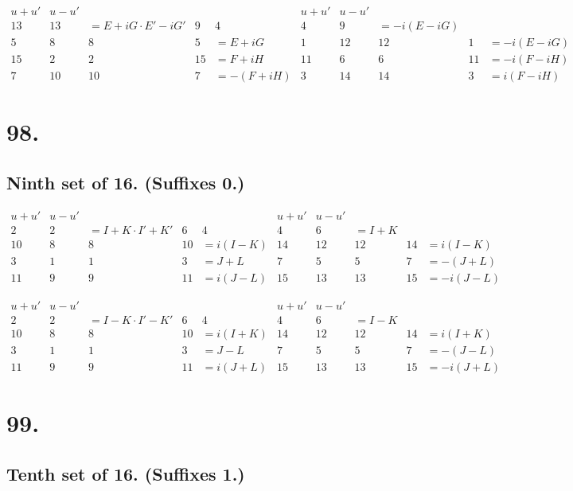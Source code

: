 \documentclass[11pt,a4paper]{book}
\begin{document}
\[
\begin{array}{c|cccc|c|cccc}
u+u' & u-u' & & & & u+u' & u-u' & & & \\
\hline
13 & 13 & = E+iG \cdot E'-iG' & 9 & 4 & 4 & 9 & = -i(E-iG) \\
5 & 8 & 8 & 5 & = E+iG & 1 & 12 & 12 & 1 & = -i(E-iG) \\
15 & 2 & 2 & 15 & = F+iH & 11 & 6 & 6 & 11 & = -i(F-iH) \\
7 & 10 & 10 & 7 & = -(F+iH) & 3 & 14 & 14 & 3 & = i(F-iH)
\end{array}
\]


\newpage
\section*{98.}
\label{sec:98}

\subsection*{Ninth set of 16. (Suffixes 0.)}

\[
\begin{array}{c|cccc|c|cccc}
u+u' & u-u' & & & & u+u' & u-u' & & & \\
\hline
2 & 2 & = I+K \cdot I'+K' & 6 & 4 & 4 & 6 & = I+K \\
10 & 8 & 8 & 10 & = i(I-K) & 14 & 12 & 12 & 14 & = i(I-K) \\
3 & 1 & 1 & 3 & = J+L & 7 & 5 & 5 & 7 & = -(J+L) \\
11 & 9 & 9 & 11 & = i(J-L) & 15 & 13 & 13 & 15 & = -i(J-L)
\end{array}
\]

\[
\begin{array}{c|cccc|c|cccc}
u+u' & u-u' & & & & u+u' & u-u' & & & \\
\hline
2 & 2 & = I-K \cdot I'-K' & 6 & 4 & 4 & 6 & = I-K \\
10 & 8 & 8 & 10 & = i(I+K) & 14 & 12 & 12 & 14 & = i(I+K) \\
3 & 1 & 1 & 3 & = J-L & 7 & 5 & 5 & 7 & = -(J-L) \\
11 & 9 & 9 & 11 & = i(J+L) & 15 & 13 & 13 & 15 & = -i(J+L)
\end{array}
\]

\newpage
\section*{99.}
\label{sec:99}

\subsection*{Tenth set of 16. (Suffixes 1.)}
\end{document}
